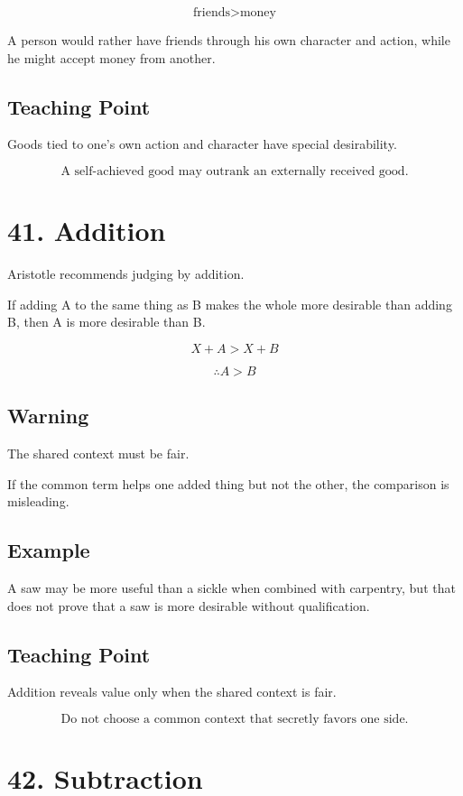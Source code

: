 \documentclass[12pt]{article}
\begin{document}
\[
\text{friends} > \text{money}
\]

A person would rather have friends through his own character and action, while
he might accept money from another.

\subsection*{Teaching Point}

Goods tied to one's own action and character have special desirability.

\[
\boxed{
\text{A self-achieved good may outrank an externally received good.}
}
\]

\section*{41. Addition}

Aristotle recommends judging by addition.

If adding A to the same thing as B makes the whole more desirable than adding B,
then A is more desirable than B.

\[
X + A > X + B
\]

\[
\therefore A > B
\]

\subsection*{Warning}

The shared context must be fair.

If the common term helps one added thing but not the other, the comparison is
misleading.

\subsection*{Example}

A saw may be more useful than a sickle when combined with carpentry, but that
does not prove that a saw is more desirable without qualification.

\subsection*{Teaching Point}

Addition reveals value only when the shared context is fair.

\[
\boxed{
\text{Do not choose a common context that secretly favors one side.}
}
\]

\section*{42. Subtraction}
\end{document}
